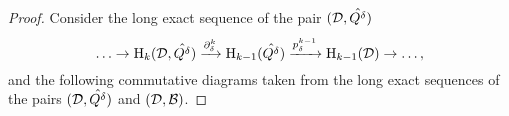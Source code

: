 \begin{proof}

  Consider the long exact sequence of the pair $({\mathcal{D}}, \hat{Q^\delta})$
  \[\ldots\to\mathrm{H}_k({\mathcal{D}}, \hat{Q^\delta})\xrightarrow{\partial^k_\delta}
    \mathrm{H}_{k-1}(\hat{Q^\delta})\xrightarrow{p^{k-1}_\delta}
    \mathrm{H}_{k-1}({\mathcal{D}})\to\ldots,\]
  and the following commutative diagrams taken from the long exact sequences of the pairs $({\mathcal{D}}, \hat{Q^\delta})$ and $({\mathcal{D}}, {\mathcal{B}})$.


\end{proof}
